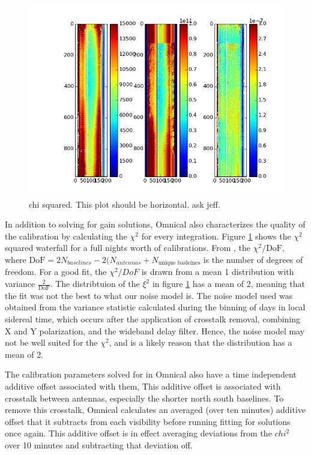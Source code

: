 \documentclass[twocolumn,numberedappendix]{emulateapj} \shorttitle{PSA64}
\begin{document}
\begin{figure}[!b]
\centering
\includegraphics[width=\columnwidth]{plots/august_chi2.png}
\caption{chi squared. This plot should be horizontal. ask jeff.}
\label{fig:chi2}
\end{figure}


In addition to solving for gain solutions, Omnical also characterizes the
quality of the calibration by calculating the $\chi^{2}$ for every integration.
Figure \ref{fig:chi2} shows the $\chi^{2}$ squared waterfall for a full
nights worth of calibrations. From \cite{zheng_et_al2014}, the
$\chi^{2}/\text{DoF}$, where $\text{DoF} = 2N_{baselines} - 2(N_{antennas} +
N_{\text{unique basleines}} $ is the number of degrees of freedom. For a good
fit, the $\chi^{2}/DoF$ is drawn from a mean 1 distribution with variance
$\frac{2}{\text{DoF}}$. The distribtuion of the $\xi^{2}$ in figure
\ref{fig:chi2} has a mean of 2, meaning that the fit was not the best to what
our noise model is.
The noise model used was obtained from the variance statistic calculated during
the binning of days in local sidereal time, which occurs after the
application of crosstalk removal, combining X and Y polarization, and the
wideband delay filter. Hence, the noise model may not be well suited for the
$\chi^{2}$, and is a likely reason that the distribution has a mean of 2.

The calibration parameters solved for in Omnical also have a time independent
additive offset associated with them, This additive offset is associated with
crosstalk between antennas, especially the shorter north south baselines.
To remove this crosstalk, Omnical calculates an averaged (over ten minutes)
additive offset that it subtracts from each visibility before running fitting
for solutions once again. This additive offset is in effect averaging deviations
from the $chi^{2}$ over 10 minutes and subtracting that deviation off.
\end{document}
